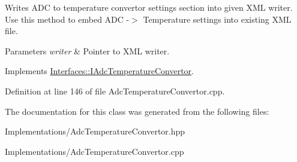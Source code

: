 Writes A\+DC to temperature convertor settings section into given X\+ML writer. Use this method to embed A\+DC -\/$>$ Temperature settings into existing X\+ML file. 


\begin{DoxyParams}{Parameters}
{\em writer} & Pointer to X\+ML writer. \\
\hline
\end{DoxyParams}


Implements \hyperlink{class_interfaces_1_1_i_adc_temperature_convertor_abc7ed5fdfeaed255af14930431b46ac1}{Interfaces\+::\+I\+Adc\+Temperature\+Convertor}.



Definition at line 146 of file Adc\+Temperature\+Convertor.\+cpp.



The documentation for this class was generated from the following files\+:\begin{DoxyCompactItemize}
\item 
Implementations/Adc\+Temperature\+Convertor.\+hpp\item 
Implementations/Adc\+Temperature\+Convertor.\+cpp\end{DoxyCompactItemize}
